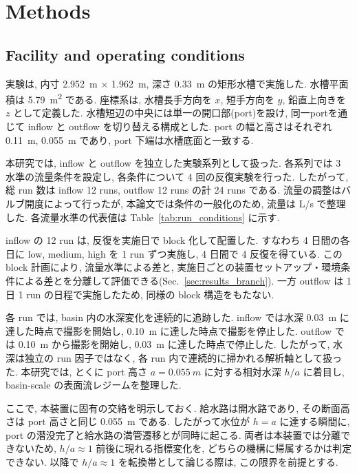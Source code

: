 \section{Methods}
\label{sec:methods}

\subsection{Facility and operating conditions}
\label{sec:methods_facility}

実験は, 内寸 \SI{2.952}{m} $\times$ \SI{1.962}{m}, 深さ \SI{0.33}{m} の矩形水槽で実施した. 水槽平面積は \SI{5.79}{m^2} である. 座標系は, 水槽長手方向を $x$, 短手方向を $y$, 鉛直上向きを $z$ として定義した. 水槽短辺の中央には単一の開口部(port)を設け, 同一portを通じて inflow と outflow を切り替える構成とした. port の幅と高さはそれぞれ \SI{0.11}{m}, \SI{0.055}{m} であり, port 下端は水槽底面と一致する.

本研究では, inflow と outflow を独立した実験系列として扱った. 各系列では 3 水準の流量条件を設定し, 各条件について 4 回の反復実験を行った. したがって, 総 run 数は inflow 12 runs, outflow 12 runs の計 24 runs である. 流量の調整はバルブ開度によって行ったが, 本論文では条件の一般化のため, 流量は L/s で整理した. 各流量水準の代表値は Table~\ref{tab:run_conditions} に示す.

inflow の 12 run は, 反復を実施日で block 化して配置した. すなわち 4 日間の各日に low, medium, high を 1 run ずつ実施し, 4 日間で 4 反復を得ている. この block 計画により, 流量水準による差と, 実施日ごとの装置セットアップ・環境条件による差とを分離して評価できる(Sec.~\ref{sec:results_branch}). 一方 outflow は 1 日 1 run の日程で実施したため, 同様の block 構造をもたない.

各 run では, basin 内の水深変化を連続的に追跡した. inflow では水深 \SI{0.03}{m} に達した時点で撮影を開始し, \SI{0.10}{m} に達した時点で撮影を停止した. outflow では \SI{0.10}{m} から撮影を開始し, \SI{0.03}{m} に達した時点で停止した. したがって, 水深は独立の run 因子ではなく, 各 run 内で連続的に掃かれる解析軸として扱った. 本研究では, とくに port 高さ $a=\SI{0.055}{m}$ に対する相対水深 $h/a$ に着目し, basin-scale の表面流レジームを整理した.

ここで, 本装置に固有の交絡を明示しておく. 給水路は開水路であり, その断面高さは port 高さと同じ \SI{0.055}{m} である. したがって水位が $h=a$ に達する瞬間に, port の潜没完了と給水路の満管遷移とが同時に起こる. 両者は本装置では分離できないため, $h/a \approx 1$ 前後に現れる指標変化を, どちらの機構に帰属するかは判定できない. 以降で $h/a \approx 1$ を転換帯として論じる際は, この限界を前提とする.

